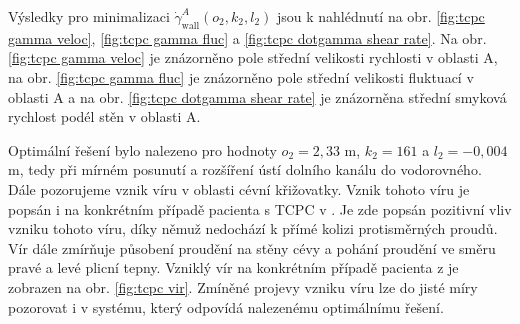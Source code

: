 Výsledky pro minimalizaci $ \dot{\gamma} ^{A}_{\text{wall}}(o_2, k_2, l_2) $ jsou k nahlédnutí na obr. \ref{fig:tcpc gamma veloc}, \ref{fig:tcpc gamma fluc} a \ref{fig:tcpc dotgamma shear rate}. Na obr. \ref{fig:tcpc gamma veloc} je znázorněno pole střední velikosti rychlosti v oblasti A, na obr. \ref{fig:tcpc gamma fluc} je znázorněno pole střední velikosti fluktuací v oblasti A a na obr. \ref{fig:tcpc dotgamma shear rate} je znázorněna střední smyková rychlost podél stěn v oblasti A.

Optimální řešení bylo nalezeno pro hodnoty $ o_2 = 2{,}33 $  m, $ k_2 = 161 $ a $ l_2 = -0{,}004 $  m, tedy při mírném posunutí a rozšíření ústí dolního kanálu do vodorovného. Dále pozorujeme vznik víru v oblasti cévní křižovatky. Vznik tohoto víru je popsán i na konkrétním případě pacienta s TCPC v \cite{Rijnberg2018}. Je zde popsán pozitivní vliv vzniku tohoto víru, díky němuž nedochází k přímé kolizi protisměrných proudů. Vír dále zmírňuje působení proudění na stěny cévy a pohání proudění ve směru pravé a levé plicní tepny. Vzniklý vír na konkrétním případě pacienta z \cite{Rijnberg2018} je zobrazen na obr. \ref{fig:tcpc vir}. Zmíněné projevy vzniku víru lze do jisté míry pozorovat i v systému, který odpovídá nalezenému optimálnímu řešení.

